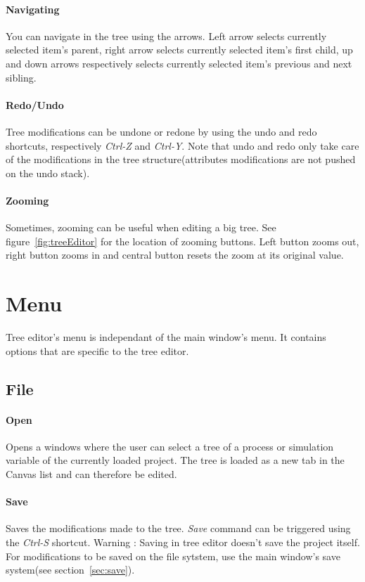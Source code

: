 \documentclass[a4paper,11pt]{report}
\begin{document}
\paragraph{Navigating}
You can navigate in the tree using the arrows. Left arrow selects currently selected item's parent, right arrow selects currently selected item's first child, up and down arrows respectively selects currently selected item's previous and next sibling.

\paragraph{Redo/Undo}
Tree modifications can be undone or redone by using the undo and redo shortcuts, respectively \emph{Ctrl-Z} and \emph{Ctrl-Y}. Note that undo and redo only take care of the modifications in the tree structure(attributes modifications are not pushed on the undo stack).

\paragraph{Zooming}
Sometimes, zooming can be useful when editing a big tree. See figure~\ref{fig:treeEditor} for the location of zooming buttons. Left button zooms out, right button zooms in and central button resets the zoom at its original value.

\section{Menu}
Tree editor's menu is independant of the main window's menu. It contains options that are specific to the tree editor.

\subsection{File}

\paragraph{Open} Opens a windows where the user can select a tree of a process or simulation variable of the currently loaded project. The tree is loaded as a new tab in the Canvas list and can therefore be edited.

\paragraph{Save} Saves the modifications made to the tree. \emph{Save} command can be triggered using the \emph{Ctrl-S} shortcut.
Warning : Saving in tree editor doesn't save the project itself. For modifications to be saved on the file sytstem, use the main window's save system(see section~\ref{sec:save}).
\end{document}
